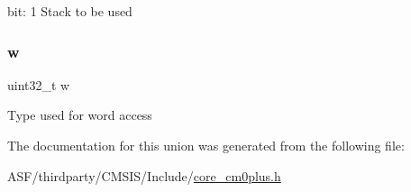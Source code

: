 bit\+: 1 Stack to be used \mbox{\label{union_c_o_n_t_r_o_l___type_ad0fb62e7a08e70fc5e0a76b67809f84b}} 
\subsubsection{\texorpdfstring{w}{w}}
{\footnotesize\ttfamily uint32\+\_\+t w}

Type used for word access 

The documentation for this union was generated from the following file\+:\begin{DoxyCompactItemize}
\item 
A\+S\+F/thirdparty/\+C\+M\+S\+I\+S/\+Include/\mbox{\hyperlink{core__cm0plus_8h}{core\+\_\+cm0plus.\+h}}\end{DoxyCompactItemize}
